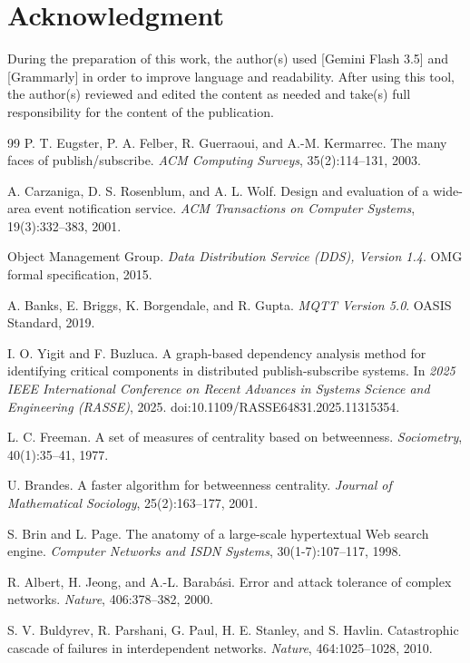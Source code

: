 \documentclass[sigconf,9pt,anonymous]{acmart}
\begin{document}
\section*{Acknowledgment}
During the preparation of this work, the author(s) used [Gemini Flash 3.5] and [Grammarly] in order to improve language and readability. After using this tool, the author(s) reviewed and edited the content as needed and take(s) full responsibility for the content of the publication.

\begin{thebibliography}{99}
P. T. Eugster, P. A. Felber, R. Guerraoui, and A.-M. Kermarrec. The many faces of publish/subscribe. \emph{ACM Computing Surveys}, 35(2):114--131, 2003.

A. Carzaniga, D. S. Rosenblum, and A. L. Wolf. Design and evaluation of a wide-area event notification service. \emph{ACM Transactions on Computer Systems}, 19(3):332--383, 2001.

Object Management Group. \emph{Data Distribution Service (DDS), Version 1.4}. OMG formal specification, 2015.

A. Banks, E. Briggs, K. Borgendale, and R. Gupta. \emph{MQTT Version 5.0}. OASIS Standard, 2019.

I. O. Yigit and F. Buzluca. A graph-based dependency analysis method for identifying critical components in distributed publish-subscribe systems. In \emph{2025 IEEE International Conference on Recent Advances in Systems Science and Engineering (RASSE)}, 2025. doi:10.1109/RASSE64831.2025.11315354.

L. C. Freeman. A set of measures of centrality based on betweenness. \emph{Sociometry}, 40(1):35--41, 1977.

U. Brandes. A faster algorithm for betweenness centrality. \emph{Journal of Mathematical Sociology}, 25(2):163--177, 2001.

S. Brin and L. Page. The anatomy of a large-scale hypertextual Web search engine. \emph{Computer Networks and ISDN Systems}, 30(1-7):107--117, 1998.

R. Albert, H. Jeong, and A.-L. Barabási. Error and attack tolerance of complex networks. \emph{Nature}, 406:378--382, 2000.

S. V. Buldyrev, R. Parshani, G. Paul, H. E. Stanley, and S. Havlin. Catastrophic cascade of failures in interdependent networks. \emph{Nature}, 464:1025--1028, 2010.


\end{thebibliography}
\end{document}
